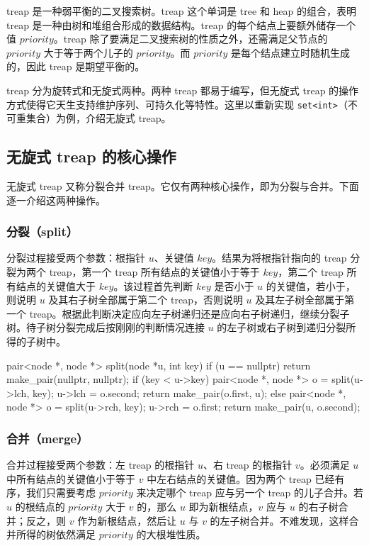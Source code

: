 
treap 是一种弱平衡的二叉搜索树。treap 这个单词是 tree 和 heap 的组合，表明 treap 是一种由树和堆组合形成的数据结构。treap 的每个结点上要额外储存一个值 $priority$。treap 除了要满足二叉搜索树的性质之外，还需满足父节点的 $priority$ 大于等于两个儿子的 $priority$。而 $priority$ 是每个结点建立时随机生成的，因此 treap 是期望平衡的。

treap 分为旋转式和无旋式两种。两种 treap 都易于编写，但无旋式 treap 的操作方式使得它天生支持维护序列、可持久化等特性。这里以重新实现 \texttt{set<int>}（不可重集合）为例，介绍无旋式 treap。

\subsection{无旋式 treap 的核心操作}

无旋式 treap 又称分裂合并 treap。它仅有两种核心操作，即为分裂与合并。下面逐一介绍这两种操作。

\subsubsection{分裂（split）}

分裂过程接受两个参数：根指针 $u$、关键值 $key$。结果为将根指针指向的 treap 分裂为两个 treap，第一个 treap 所有结点的关键值小于等于 $key$，第二个 treap 所有结点的关键值大于 $key$。该过程首先判断 $key$ 是否小于 $u$ 的关键值，若小于，则说明 $u$ 及其右子树全部属于第二个 treap，否则说明 $u$ 及其左子树全部属于第一个 treap。根据此判断决定应向左子树递归还是应向右子树递归，继续分裂子树。待子树分裂完成后按刚刚的判断情况连接 $u$ 的左子树或右子树到递归分裂所得的子树中。

\begin{cppcode}
pair<node *, node *> split(node *u, int key) {
  if (u == nullptr) {
    return make_pair(nullptr, nullptr);
  }
  if (key < u->key) {
    pair<node *, node *> o = split(u->lch, key);
    u->lch = o.second;
    return make_pair(o.first, u);
  } else {
    pair<node *, node *> o = split(u->rch, key);
    u->rch = o.first;
    return make_pair(u, o.second);
  }
}
\end{cppcode}

\subsubsection{合并（merge）}

合并过程接受两个参数：左 treap 的根指针 $u$、右 treap 的根指针 $v$。必须满足 $u$ 中所有结点的关键值小于等于 $v$ 中左右结点的关键值。因为两个 treap 已经有序，我们只需要考虑 $priority$ 来决定哪个 treap 应与另一个 treap 的儿子合并。若 $u$ 的根结点的 $priority$ 大于 $v$ 的，那么 $u$ 即为新根结点，$v$ 应与 $u$ 的右子树合并；反之，则 $v$ 作为新根结点，然后让 $u$ 与 $v$ 的左子树合并。不难发现，这样合并所得的树依然满足 $priority$ 的大根堆性质。

